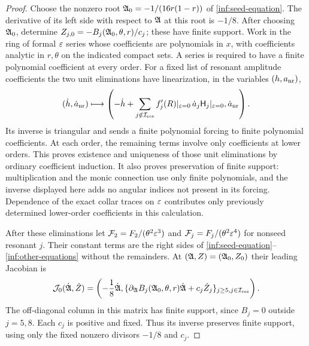 \begin{proof}
Choose the nonzero root
$\mathfrak A_0=-1/(16r(1-r))$ of \eqref{inf:seed-equation}.
The derivative of its left side with respect to $\mathfrak A$ at this root is
$-1/8$. After choosing $\mathfrak A_0$, determine
$Z_{j,0}=-B_j(\mathfrak A_0,\theta,r)/c_j$; these have finite support.
Work in the ring of formal
$\varepsilon$ series whose coefficients are polynomials in $x$, with
coefficients analytic in $r,\theta$ on the indicated compact sets.
A series is required to have a finite polynomial coefficient at
every order.
For a fixed list of resonant amplitude coefficients the two unit
eliminations have linearization, in the variables $(h,a_{\rm nr})$,
\[
 (\dot h,\dot a_{\rm nr})\longmapsto
 \left(-\dot h+\sum_{j\notin\mathcal I_{\mathrm{res}}}
       f'_j(R)|_{\varepsilon=0}\,\dot a_j\mathsf H_j|_{\varepsilon=0},
       \dot a_{\rm nr}\right).
\]
Its inverse is triangular and sends a finite polynomial forcing
to finite polynomial coefficients. At each order, the remaining
terms involve only coefficients at lower orders. This proves
existence and uniqueness of those unit eliminations by ordinary
coefficient induction. It also proves preservation of finite
support: multiplication and the monic connection use only finite
polynomials, and the inverse displayed here adds no angular
indices not present in its forcing. Dependence of the exact
collar traces on $\varepsilon$ contributes only previously determined
lower-order coefficients in this calculation.

After these eliminations let
$\mathcal F_2=F_2/(\theta^2\varepsilon^3)$ and
$\mathcal F_j=F_j/(\theta^2\varepsilon^4)$ for nonseed resonant $j$.
Their constant terms are the right sides of
\eqref{inf:seed-equation}--\eqref{inf:other-equations} without the
remainders. At $(\mathfrak A,Z)=(\mathfrak A_0,Z_0)$ their leading Jacobian is
\begin{equation}\label{inf:formal-Jacobian}
 \mathcal J_0(\dot{\mathfrak A},\dot Z)=
 \left(-\frac18\dot{\mathfrak A},
       \{\partial_{\mathfrak A}B_j(\mathfrak A_0,\theta,r)\dot{\mathfrak A}+c_j\dot Z_j\}_{j\ge5,
                                                    j\in\mathcal I_{\mathrm{res}}}\right).
\end{equation}
The off-diagonal column in this matrix has finite support,
since $B_j=0$ outside $j=5,8$. Each $c_j$ is positive and fixed.
Thus its inverse preserves finite support, using only the fixed
nonzero divisors $-1/8$ and $c_j$.


\end{proof}
